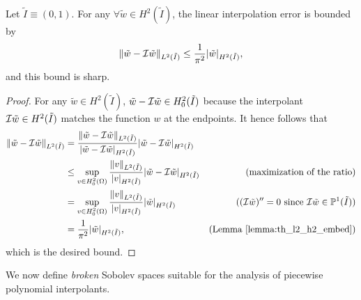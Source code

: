 \begin{proposition}
  \label{prop:th_lin_interp_L2_ref}
  Let $\tilde I \equiv (0,1)$.  For any $\forall \tilde w \in H^2(\tilde I)$, the linear interpolation error is bounded by 
  \begin{equation*}
    \| \tilde w - \mathcal{I} \tilde w \|_{L^2(\tilde I)}
    \leq \frac{1}{\pi^2} | \tilde w |_{H^2(\tilde I)},
  \end{equation*}
  and this bound is sharp.
  \begin{proof}
    For any $\tilde w \in H^2(\tilde I)$, $\tilde w - \mathcal{I} \tilde w \in H^2_0(\tilde I)$ because the interpolant $\mathcal{I} \tilde w \in H^2(\tilde I)$ matches the function $w$ at the endpoints. It hence follows that
    \begin{align*}
      \| \tilde w - \mathcal{I} \tilde w \|_{L^2(\tilde I)}
      &=
      \frac{\| \tilde w - \mathcal{I} \tilde w \|_{L^2(\tilde I)}}{| \tilde w - \mathcal{I} \tilde w |_{H^2(\tilde I)}} | \tilde w - \mathcal{I} \tilde w |_{H^2(\tilde I)}
      \\
      &\leq \sup_{v \in H^2_0(\Omega)} \frac{\| v \|_{L^2(\tilde I)}}{| v |_{H^2(\tilde I)}} | \tilde w - \mathcal{I} \tilde w |_{H^2(\tilde I)}
      & \text{(maximization of the ratio)}\\
      &= \sup_{v \in H^2_0(\Omega)} \frac{\| v \|_{L^2(\tilde I)}}{| v |_{H^2(\tilde I)}} | \tilde w |_{H^2(\tilde I)}
      & \text{($(\mathcal{I} \tilde w)'' = 0$ since $\mathcal{I} \tilde w \in \mathbb{P}^1(\tilde I)$)} \\
      &= \frac{1}{\pi^2} | \tilde w |_{H^2(\tilde I)},
      & \text{(Lemma~\ref{lemma:th_l2_h2_embed})}
    \end{align*}
    which is the desired bound.
  \end{proof}
\end{proposition}
We now define \emph{broken} Sobolev spaces suitable for the analysis of piecewise polynomial interpolants.
